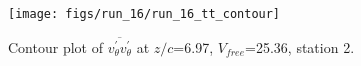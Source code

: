\begin{figure}[H]
\centering
\texttt{[image: figs/run\_16/run\_16\_tt\_contour]}
\caption{Contour plot of $\overline{v_{\theta}^{\prime} v_{\theta}^{\prime}}$ at $z/c$=6.97, $V_{free}$=25.36, station 2.}
\label{fig:run_16_tt_contour}
\end{figure}


